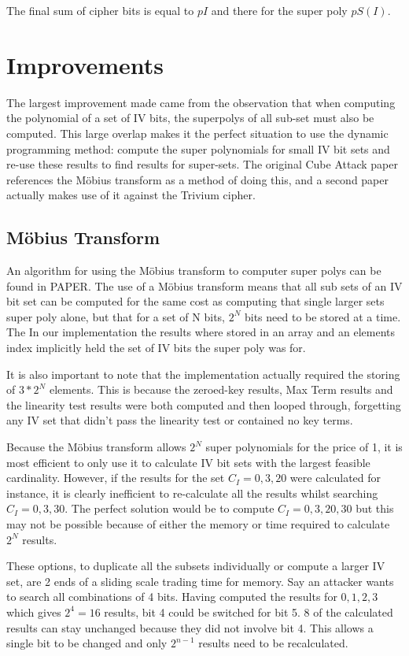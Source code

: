 \documentclass{report}
\let\Oldsection\section
\renewcommand{\section}{\FloatBarrier\Oldsection}
\let\Oldsubsection\subsection
\renewcommand{\subsection}{\FloatBarrier\Oldsubsection}
\begin{document}
The final sum of cipher bits is equal to $pI$ and there for the super poly $pS(I)$.
\section{Improvements}
The largest improvement made came from the observation that when computing the polynomial of a set of IV bits, the superpolys of all sub-set must also be computed. This large overlap makes it the perfect situation to use the dynamic programming method: compute the super polynomials for small IV bit sets and re-use these results to find results for super-sets. The original Cube Attack paper references the Möbius transform as a method of doing this, and a second paper %
actually makes use of it against the Trivium cipher. %
\subsection{Möbius Transform}
An algorithm for using the Möbius transform to computer super polys can be found in PAPER.
The use of a Möbius transform means that all sub sets of an IV bit set can be computed for the same cost as computing that single larger sets super poly alone, but that for a set of N bits, $2^N$ bits need to be stored at a time. The In our implementation the results where stored in an array and an elements index implicitly held the set of IV bits the super poly was for.%

It is also important to note that the implementation actually required the storing of $3*2^N$ elements. This is because the zeroed-key results, Max Term results and the linearity test results were both computed and then looped through, forgetting any IV set that didn't pass the linearity test or contained no key terms.

Because the Möbius transform allows $2^N$ super polynomials for the price of 1, it is most efficient to only use it to calculate IV bit sets with the largest feasible cardinality. However, if the results for the set $C_I={0,3,20}$ were calculated for instance, it is clearly inefficient to re-calculate all the results whilst searching $C_I={0,3,30}$. The perfect solution would be to compute $C_I={0,3,20,30}$ but this may not be possible because of either the memory or time required to calculate $2^N$ results.

These options, to duplicate all the subsets individually or compute a larger IV set, are 2 ends of a sliding scale trading time for memory. Say an attacker wants to search all combinations of 4 bits. Having computed the results for ${0,1,2,3}$ which gives $2^4=16$ results, bit 4 could be switched for bit 5. 8 of the calculated results can stay unchanged because they did not involve bit 4. This allows a single bit to be changed and only $2^{n-1}$ results need to be recalculated.
\end{document}
